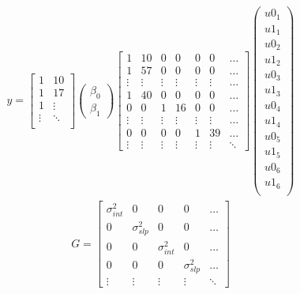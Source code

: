 \documentclass[12pt,letterpaper,oneside]{article}\usepackage{graphicx, color}
\begin{document}
\begin{align*}
    y = \begin{bmatrix}
        1 & 10\\
        1 & 17\\
        1 & \vdots\\
        \vdots & \ddots\\
    \end{bmatrix}
    \begin{pmatrix}
        \beta_{0}\\
        \beta_{1}
    \end{pmatrix}
    \begin{bmatrix}
        1 & 10 & 0 & 0 & 0 & 0 & \ldots \\
        1 & 57 & 0 & 0 & 0 & 0 & \ldots \\
        \vdots & \vdots & \vdots & \vdots & \vdots & \vdots & \ldots \\
        1 & 40 & 0 & 0 & 0 & 0 & \ldots \\
        0 & 0 & 1 & 16 & 0 & 0 & \ldots \\
        \vdots & \vdots & \vdots & \vdots & \vdots & \vdots & \ldots \\
        0 & 0 & 0 & 0 & 1 & 39 & \ldots \\
        \vdots & \vdots & \vdots & \vdots & \vdots & \vdots & \ddots
    \end{bmatrix}
\begin{pmatrix}
    u0_{1}\\
    u1_{1}\\
    u0_{2}\\
    u1_{2}\\
    u0_{3}\\
    u1_{3}\\
    u0_{4}\\
    u1_{4}\\
    u0_{5}\\
    u1_{5}\\
    u0_{6}\\
    u1_{6}\\
\end{pmatrix}
\end{align*}
\begin{align*}
    G=\begin{bmatrix}
        \sigma^{2}_{int} & 0                & 0                & 0 & \ldots \\
        0                & \sigma^{2}_{slp} & 0                & 0 & \ldots \\
        0                & 0                & \sigma^{2}_{int} & 0 & \ldots \\
        0                & 0                & 0                & \sigma^{2}_{slp} & \ldots \\
        \vdots & \vdots & \vdots & \vdots & \ddots
    \end{bmatrix}
\end{align*}
\end{document}
